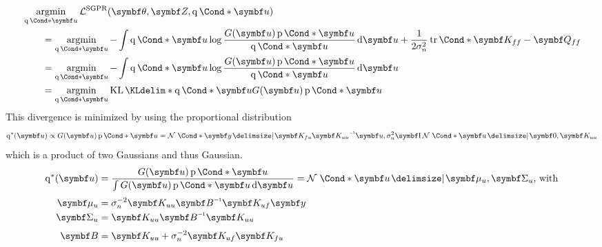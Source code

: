 \begin{align}
    \begin{split}
        \MoveEqLeft\argmin_{\Variat*{\mat{u}}}\Lc^{\text{SGPR}}(\mat{\theta}, \mat{Z}, \Variat*{\mat{u}})                                                                                             \\
        & = \argmin_{\Variat*{\mat{u}}} -\int \Variat*{\mat{u}} \log\frac{G(\mat{u})\Prob*{\mat{u}}}{\Variat*{\mat{u}}} \diff \mat{u} + \frac{1}{2\sigma_n^2}\Fun*{\tr}{\mat{K_{ff}} - \mat{Q_{ff}}} \\
        & = \argmin_{\Variat*{\mat{u}}} -\int \Variat*{\mat{u}} \log\frac{G(\mat{u})\Prob*{\mat{u}}}{\Variat*{\mat{u}}} \diff \mat{u}                                                                \\
        & = \argmin_{\Variat*{\mat{u}}} \KL*{\Variat*{\mat{u}}}{G(\mat{u})\Prob*{\mat{u}}}
    \end{split}
\end{align}
This divergence is minimized by using the proportional distribution
\begin{align}
    \q^\ast(\mat{u}) \propto G(\mat{u}) \Prob*{\mat{u}} = \Gaussian*{\mat{y} \given \mat{K_{fu}} \mat{K_{uu}}\inv \mat{u}, \sigma_n^2\Eye}\Gaussian*{\mat{u} \given \mat{0}, \mat{K_{uu}}}
\end{align}
which is a product of two Gaussians and thus Gaussian.
\begin{align}
    \begin{split}
        \q^\ast(\mat{u})
        & = \frac{G(\mat{u}) \Prob*{\mat{u}}}{\int G(\mat{u}) \Prob*{\mat{u}} \diff \mat{u}}
        = \Gaussian*{\mat{u} \given \mat{\mu_u}, \mat{\Sigma_u}}\text{, with}                 \\[\smallskipamount]
        \mat{\mu_u}
        & = \sigma_n^{-2} \mat{K_{uu}}\mat{B}\inv \mat{K_{uf}}\mat{y}                        \\
        \mat{\Sigma_u}
        & = \mat{K_{uu}}\mat{B}\inv\mat{K_{uu}}                                              \\[\smallskipamount]
        \mat{B}
        & = \mat{K_{uu}} + \sigma_n^{-2} \mat{K_{uf}}\mat{K_{fu}}
    \end{split}
\end{align}

